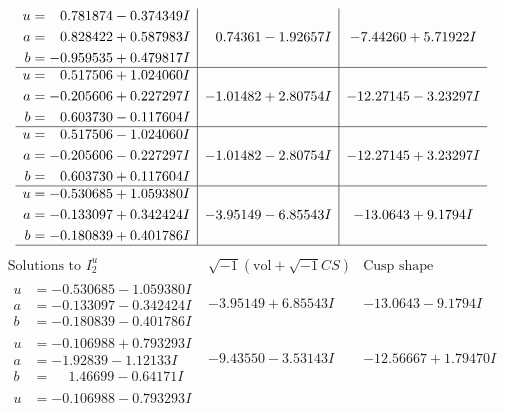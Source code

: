 \documentclass[1p]{elsarticle_modified}
\theoremstyle{definition}
\newcommand{\I}{\sqrt{-1}}
\begin{document}
$$\begin{array}{c|c|c}
\begin{aligned}
u &= \phantom{-}0.781874 - 0.374349 I \\
a &= \phantom{-}0.828422 + 0.587983 I \\
b &= -0.959535 + 0.479817 I\end{aligned}
 & \phantom{-}0.74361 - 1.92657 I & -7.44260 + 5.71922 I \\ \hline\begin{aligned}
u &= \phantom{-}0.517506 + 1.024060 I \\
a &= -0.205606 + 0.227297 I \\
b &= \phantom{-}0.603730 - 0.117604 I\end{aligned}
 & -1.01482 + 2.80754 I & -12.27145 - 3.23297 I \\ \hline\begin{aligned}
u &= \phantom{-}0.517506 - 1.024060 I \\
a &= -0.205606 - 0.227297 I \\
b &= \phantom{-}0.603730 + 0.117604 I\end{aligned}
 & -1.01482 - 2.80754 I & -12.27145 + 3.23297 I \\ \hline\begin{aligned}
u &= -0.530685 + 1.059380 I \\
a &= -0.133097 + 0.342424 I \\
b &= -0.180839 + 0.401786 I\end{aligned}
 & -3.95149 - 6.85543 I & -13.0643 + 9.1794 I\\
 \hline 
 \end{array}$$\newpage$$\begin{array}{c|c|c}  
\text{Solutions to }I^u_{2}& \I (\text{vol} + \sqrt{-1}CS) & \text{Cusp shape}\\
 \hline 
\begin{aligned}
u &= -0.530685 - 1.059380 I \\
a &= -0.133097 - 0.342424 I \\
b &= -0.180839 - 0.401786 I\end{aligned}
 & -3.95149 + 6.85543 I & -13.0643 - 9.1794 I \\ \hline\begin{aligned}
u &= -0.106988 + 0.793293 I \\
a &= -1.92839 - 1.12133 I \\
b &= \phantom{-}1.46699 - 0.64171 I\end{aligned}
 & -9.43550 - 3.53143 I & -12.56667 + 1.79470 I \\ \hline\begin{aligned}
u &= -0.106988 - 0.793293 I \\

\end{aligned}
\end{array}$$
\end{document}
